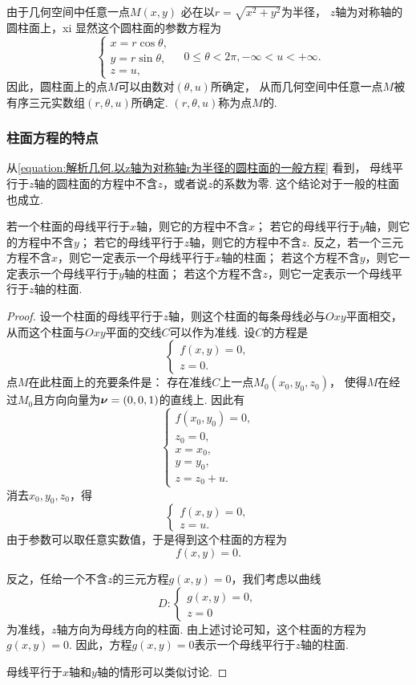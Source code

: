 由于几何空间中任意一点\(M(x,y)\)
必在以\(r=\sqrt{x^2+y^2}\)为半径，
\(z\)轴为对称轴的圆柱面上，xi
显然这个圆柱面的参数方程为\[
	\left\{ \begin{array}{l}
		x = r \cos\theta, \\
		y = r \sin\theta, \\
		z = u,
	\end{array} \right.
	\quad 0\leq \theta < 2\pi,
	-\infty < u < +\infty.
\]
因此，圆柱面上的点\(M\)可以由数对\((\theta,u)\)所确定，
从而几何空间中任意一点\(M\)被有序三元实数组\((r,\theta,u)\)所确定.
\((r,\theta,u)\)称为点\(M\)的.

\subsubsection{柱面方程的特点}
从\cref{equation:解析几何.以z轴为对称轴r为半径的圆柱面的一般方程} 看到，
母线平行于\(z\)轴的圆柱面的方程中不含\(z\)，或者说\(z\)的系数为零.
这个结论对于一般的柱面也成立.
\begin{theorem}
若一个柱面的母线平行于\(x\)轴，则它的方程中不含\(x\)；
若它的母线平行于\(y\)轴，则它的方程中不含\(y\)；
若它的母线平行于\(z\)轴，则它的方程中不含\(z\).
反之，若一个三元方程不含\(x\)，则它一定表示一个母线平行于\(x\)轴的柱面；
若这个方程不含\(y\)，则它一定表示一个母线平行于\(y\)轴的柱面；
若这个方程不含\(z\)，则它一定表示一个母线平行于\(z\)轴的柱面.
\begin{proof}
设一个柱面的母线平行于\(z\)轴，则这个柱面的每条母线必与\(Oxy\)平面相交，
从而这个柱面与\(Oxy\)平面的交线\(C\)可以作为准线.
设\(C\)的方程是\[
	\left\{ \begin{array}{l}
		f(x,y) = 0, \\
		z = 0.
	\end{array} \right.
\]
点\(M\)在此柱面上的充要条件是：
存在准线\(C\)上一点\(M_0(x_0,y_0,z_0)\)，
使得\(M\)在经过\(M_0\)且方向向量为\(\boldsymbol{\nu}=(0,0,1)\)的直线上.
因此有\[
	\left\{ \begin{array}{l}
		f(x_0,y_0) = 0, \\
		z_0 = 0, \\
		x = x_0, \\
		y = y_0, \\
		z = z_0 + u.
	\end{array} \right.
\]
消去\(x_0,y_0,z_0\)，得\[
	\left\{ \begin{array}{l}
		f(x,y) = 0, \\
		z = u.
	\end{array} \right.
\]
由于参数可以取任意实数值，于是得到这个柱面的方程为\[
	f(x,y) = 0.
\]

反之，任给一个不含\(z\)的三元方程\(g(x,y)=0\)，我们考虑以曲线\[
	D: \left\{ \begin{array}{l}
		g(x,y) = 0, \\
		z = 0
	\end{array} \right.
\]
为准线，\(z\)轴方向为母线方向的柱面.
由上述讨论可知，这个柱面的方程为\(g(x,y)=0\).
因此，方程\(g(x,y)=0\)表示一个母线平行于\(z\)轴的柱面.

母线平行于\(x\)轴和\(y\)轴的情形可以类似讨论.
\end{proof}
\end{theorem}

